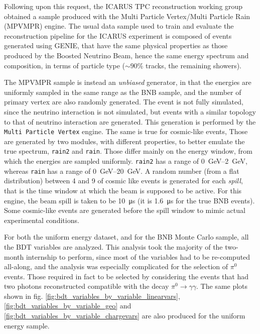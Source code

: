 Following upon this request, the ICARUS TPC reconstruction working group obtained a sample produced with the Multi Particle Vertex/Multi Particle Rain (MPVMPR) engine. The usual data sample used to train and evaluate the reconstruction pipeline for the ICARUS experiment is composed of events generated using GENIE, that have the same physical properties as those produced by the Boosted Neutrino Beam, hence the same energy spectrum and composition, in terms of particle type ($\sim 90\%$ tracks, the remaining showers). 

The MPVMPR sample is instead an \emph{unbiased} generator, in that the energies are uniformly sampled in the same range as the BNB sample, and the number of primary vertex are also randomly generated. The event is not fully simulated, since the neutrino interaction is not simulated, but events with a similar topology to that of neutrino interaction are generated. This generation is performed by the \texttt{Multi Particle Vertex} engine. The same is true for cosmic-like events, Those are generated by two modules, with different properties, to better emulate the true spectrum, \texttt{rain2} and \texttt{rain}. Those differ mainly on the energy window, from which the energies are sampled uniformly. \texttt{rain2} has a range of \qtyrange{0}{2}{GeV}, whereas \texttt{rain} has a range of \qtyrange{0}{20}{GeV}. A random number (from a flat distribution) between 4 and 9 of cosmic like events is generated for each \emph{spill}, that is the time window at which the beam is supposed to be active. For this engine, the beam spill is taken to be \SI{10}{\micro\second} (it is \SI{1.6}{\micro\second} for the true BNB events). Some cosmic-like events are generated before the spill window to mimic actual experimental conditions.

For both the uniform energy dataset, and for the BNB Monte Carlo sample, all the BDT variables are analyzed. This analysis took the majority of the two-month internship to perform, since most of the variables had to be re-computed all-along, and the analysis was especially complicated for the selection of $\pi^0$ events. Those required in fact to be selected by considering the events that had two photons reconstructed compatible with the decay $\pi^0\to\gamma\gamma$. The same plots shown in fig. \ref{fig:bdt_variables_by_variable_linearvars}, \ref{fig:bdt_variables_by_variable_geo} and \ref{fig:bdt_variables_by_variable_chargevars} are also produced for the uniform energy sample.  



